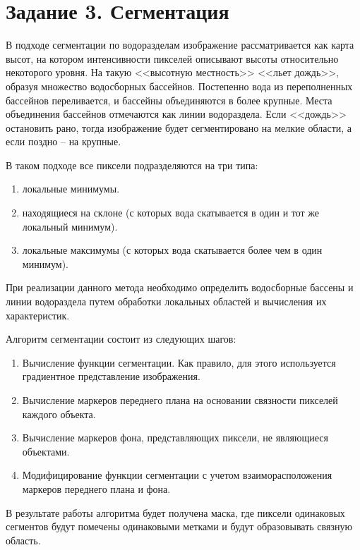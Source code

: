\documentclass[a4paper, 12pt]{article}
\begin{document}
    \section{Задание 3. Сегментация}
    В подходе сегментации по водоразделам изображение рассматривается как карта высот,
    на котором интенсивности пикселей описывают высоты относительно некоторого уровня.
    На такую <<высотную местность>> <<льет дождь>>, образуя множество водосборных бассейнов.
    Постепенно вода из переполненных бассейнов переливается, и бассейны объединяются в более крупные.
    Места объединения бассейнов отмечаются как линии водораздела. Если <<дождь>> остановить рано,
    тогда изображение будет сегментировано на мелкие области, а
    если поздно -- на крупные.
    
    
    В таком подходе все пиксели подразделяются на три типа:
    \begin{enumerate}
        \item локальные минимумы.
        \item находящиеся на склоне (с которых вода скатывается в один и тот же локальный минимум).
        \item локальные максимумы (с которых вода скатывается более чем в один минимум).
    \end{enumerate}
    При реализации данного метода необходимо определить водосборные бассены и линии
    водораздела путем обработки локальных областей и вычисления их характеристик.
    
    
    Алгоритм сегментации
    состоит из следующих шагов:
    \begin{enumerate}
        \item Вычисление функции сегментации. Как правило, для этого используется градиентное представление изображения.
        \item Вычисление маркеров переднего плана на основании связности пикселей каждого объекта.
        \item Вычисление маркеров фона, представляющих пиксели, не являющиеся объектами.
        \item Модифицирование функции сегментации с учетом взаиморасположения маркеров переднего плана и фона.
    \end{enumerate}
    В результате работы алгоритма будет получена маска, где пиксели одинаковых сегментов будут помечены одинаковыми метками
    и будут образовывать связную область.
\end{document}
